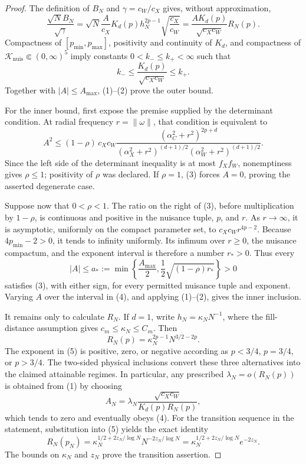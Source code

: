 \documentclass{article}
\begin{document}
\begin{proof}
The definition of \(B_N\) and \(\gamma=c_W/c_X\) gives, without approximation,
\[
 \frac{\sqrt N B_N}{\sqrt\gamma}
 =\sqrt N\frac{A}{c_X}K_d(p)h_N^{2p-1}
   \sqrt{\frac{c_X}{c_W}}
 =\frac{AK_d(p)}{\sqrt{c_Xc_W}}R_N(p).                                      \tag{1}
\]
Compactness of \([p_{\min},p_{\max}]\), positivity and continuity of \(K_d\), and compactness of \(\mathcal K_{\mathrm{nuis}}\Subset(0,\infty)^5\) imply constants \(0<k_-\le k_+<\infty\) such that
\[
 k_-\le \frac{K_d(p)}{\sqrt{c_Xc_W}}\le k_+.                                \tag{2}
\]
Together with \(|A|\le A_{\max}\), (1)--(2) prove the outer bound.

For the inner bound, first expose the premise supplied by the determinant condition.  At radial frequency \(r=\|\omega\|\), that condition is equivalent to
\[
 A^2\le(1-\rho)\,
 c_Xc_W\frac{(\alpha_C^2+r^2)^{2p+d}}
 { (\alpha_X^2+r^2)^{(d+1)/2}(\alpha_W^2+r^2)^{(d+1)/2}}.                    \tag{3}
\]
Since the left side of the determinant inequality is at most \(f_Xf_W\), nonemptiness gives \(\rho\le1\); positivity of \(\rho\) was declared.  If \(\rho=1\), (3) forces \(A=0\), proving the asserted degenerate case.

Suppose now that \(0<\rho<1\).  The ratio on the right of (3), before multiplication by \(1-\rho\), is continuous and positive in the nuisance tuple, \(p\), and \(r\).  As \(r\to\infty\), it is asymptotic, uniformly on the compact parameter set, to \(c_Xc_W r^{4p-2}\).  Because \(4p_{\min}-2>0\), it tends to infinity uniformly.  Its infimum over \(r\ge0\), the nuisance compactum, and the exponent interval is therefore a number \(r_*>0\).  Thus every
\[
 |A|\le a_*:=\min\left\{\frac{A_{\max}}2,
          \frac12\sqrt{(1-\rho)r_*}\right\}>0                              \tag{4}
\]
satisfies (3), with either sign, for every permitted nuisance tuple and exponent.  Varying \(A\) over the interval in (4), and applying (1)--(2), gives the inner inclusion.

It remains only to calculate \(R_N\).  If \(d=1\), write \(h_N=\kappa_NN^{-1}\), where the fill-distance assumption gives \(c_m\le\kappa_N\le C_m\).  Then
\[
 R_N(p)=\kappa_N^{2p-1}N^{3/2-2p}.                                           \tag{5}
\]
The exponent in (5) is positive, zero, or negative according as \(p<3/4\), \(p=3/4\), or \(p>3/4\).  The two-sided physical inclusions convert these three alternatives into the claimed attainable regimes.  In particular, any prescribed \(\lambda_N=o(R_N(p))\) is obtained from (1) by choosing
\[
 A_N=\lambda_N\frac{\sqrt{c_Xc_W}}{K_d(p)R_N(p)},                             \tag{6}
\]
which tends to zero and eventually obeys (4).  For the transition sequence in the statement, substitution into (5) yields the exact identity
\[
 R_N(p_N)
 =\kappa_N^{1/2+2z_N/\log N}N^{-2z_N/\log N}
 =\kappa_N^{1/2+2z_N/\log N}e^{-2z_N}.                                       \tag{7}
\]
The bounds on \(\kappa_N\) and \(z_N\) prove the transition assertion.


\end{proof}
\end{document}

